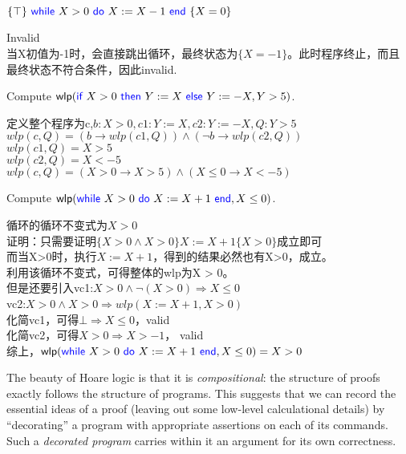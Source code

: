 \documentclass[11pt,a4paper]{article}
\newcommand{\kword}[1]{{\color{blue} \textsf{#1}}}
\newcommand{\If}{\kword{if}}
\newcommand{\Then}{\kword{then}}
\newcommand{\Else}{\kword{else}}
\newcommand{\While}{\kword{while}}
\newcommand{\Do}{\kword{do}}
\newcommand{\End}{\kword{end}}
\newcommand{\wlp}[2]{\textsf{wlp}(#1, #2)}
\begin{document}
\subproblem $\{\top\}~\While~X > 0~\Do~X := X - 1~\End~\{X = 0\}$

\begin{solution}
    Invalid\\
    当X初值为-1时，会直接跳出循环，最终状态为$\{X = -1\}$。此时程序终止，而且最终状态不符合条件，因此invalid.
\end{solution}

\newpage
{}

\subproblem Compute $\wlp{\If~X > 0~\Then~Y := X~\Else~Y := -X}{Y > 5}$.

\begin{solution}
    定义整个程序为c,$b: X > 0,c1: Y:=X, c2:Y := -X, Q:Y>5$\\
    $wlp(c, Q) = (b \to wlp(c1, Q)) \land (\lnot b \to wlp(c2, Q))$\\
    $wlp(c1, Q) = X > 5$\\
    $wlp(c2, Q) = X < -5$\\
    $wlp(c, Q) = (X > 0 \to X > 5) \land (X \leq 0 \to X < -5)$
\end{solution}

\subproblem Compute $\wlp{\While~X > 0~\Do~X := X + 1~\End}{X \le 0}$.

\begin{solution}
    循环的循环不变式为$X > 0$\\
    证明：只需要证明$\{X > 0 \land X > 0\}X:=X+1\{X > 0\}$成立即可\\
    而当X>0时，执行$X:=X+1$，得到的结果必然也有X>0，成立。\\
    利用该循环不变式，可得整体的wlp为X > 0。\\
    但是还要引入vc1:$X>0 \land \lnot(X > 0) \Rightarrow X \leq 0$\\
    vc2:$X >0 \land X > 0 \Rightarrow wlp(X:=X+1, X >0)$\\
    化简vc1，可得$\bot \Rightarrow X \leq 0$，valid\\
    化简vc2，可得$X > 0 \Rightarrow X > -1$， valid\\
    综上，$\wlp{\While~X > 0~\Do~X := X + 1~\End}{X \le 0} = X > 0$
\end{solution}

\newpage
{}

The beauty of Hoare logic is that it is \emph{compositional}:
the structure of proofs exactly follows the structure of programs.
This suggests that we can record the essential ideas of a proof (leaving out some low-level calculational details)
by ``decorating'' a program with appropriate assertions on each of its commands.
Such a \emph{decorated program} carries within it an argument for its own correctness.
\end{document}
